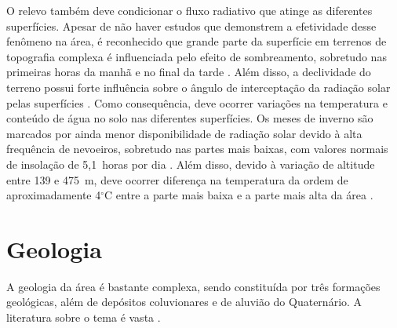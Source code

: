 O relevo também deve condicionar o fluxo radiativo que atinge as diferentes superfícies. Apesar de não haver estudos que demonstrem a efetividade desse fenômeno na área, é reconhecido que grande parte da superfície em terrenos de topografia complexa é influenciada pelo efeito de sombreamento, sobretudo nas primeiras horas da manhã e no final da tarde \cite{OliphantEtAl2003}. Além disso, a declividade do terreno possui forte influência sobre o ângulo de interceptação da radiação solar pelas superfícies \cite{Birkeland1999}. Como consequência, deve ocorrer variações na temperatura e conteúdo de água no solo nas diferentes superfícies. Os meses de inverno são marcados por ainda menor disponibilidade de radiação solar devido à alta frequência de nevoeiros, sobretudo nas partes mais baixas, com valores normais de insolação de 5,1~horas por dia \cite{HeldweinEtAl2009}. Além disso, devido à variação de altitude entre 139 e 475~m, deve ocorrer diferença na temperatura da ordem de aproximadamente 4$^\circ$C entre a parte mais baixa e a parte mais alta da área \cite{HeldweinEtAl2009}.

\section{Geologia}

A geologia da área é bastante complexa, sendo constituída por três formações geológicas, além de depósitos coluvionares e de aluvião do Quaternário. A literatura sobre o tema é vasta \cite{Bortoluzzi1974, Brasil1980, GasparettoEtAl1988, MacielFilho1990, PieriniEtAl2002, MarquesEtAl2005, Milani2005, Pinto2005, CPRM2007, Pedron2007, Sartori2009, NascimentoEtAl2010, WerlangEtAl2010, Machado2012, PedronEtAl2012}.


